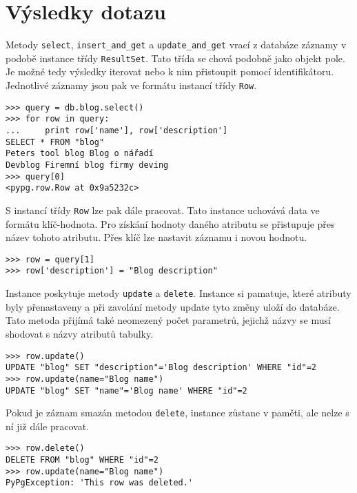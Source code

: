 \documentclass[11pt]{article}
\begin{document}
\section{Výsledky dotazu}

Metody \lstinline[style=inline]|select|, \lstinline[style=inline]|insert_and_get| a \lstinline[style=inline]|update_and_get| vrací z databáze záznamy v podobě instance třídy \lstinline[style=inline]|ResultSet|. Tato třída se chová podobně jako objekt pole. Je možné tedy výsledky iterovat nebo k nim přistoupit pomocí identifikátoru. Jednotlivé záznamy jsou pak ve formátu instancí třídy \lstinline[style=inline]|Row|.

\begin{lstlisting}[style=python]
>>> query = db.blog.select()
>>> for row in query:
...     print row['name'], row['description']
SELECT * FROM "blog"
Peters tool blog Blog o nářadí
Devblog Firemní blog firmy deving
>>> query[0]
<pypg.row.Row at 0x9a5232c>
\end{lstlisting}

S instancí třídy \lstinline[style=inline]|Row| lze pak dále pracovat. Tato instance uchovává data ve formátu klíč-hodnota. Pro získání hodnoty daného atributu se přistupuje přes název tohoto atributu. Přes klíč lze nastavit záznamu i novou hodnotu.
\begin{lstlisting}[style=python]
>>> row = query[1]
>>> row['description'] = "Blog description"
\end{lstlisting}

Instance poskytuje metody \lstinline[style=inline]|update| a \lstinline[style=inline]|delete|. Instance si pamatuje, které atributy byly přenastaveny a při zavolání metody update tyto změny uloží do databáze. Tato metoda přijímá také neomezený počet parametrů, jejichž názvy se musí shodovat s názvy atributů tabulky.
\begin{lstlisting}[style=python]
>>> row.update()
UPDATE "blog" SET "description"='Blog description' WHERE "id"=2
>>> row.update(name="Blog name")
UPDATE "blog" SET "name"='Blog name' WHERE "id"=2
\end{lstlisting}

Pokud je záznam smazán metodou \lstinline[style=inline]|delete|, instance zůstane v paměti, ale nelze s ní již dále pracovat.
\begin{lstlisting}[style=python]
>>> row.delete()
DELETE FROM "blog" WHERE "id"=2
>>> row.update(name="Blog name")
PyPgException: 'This row was deleted.'
\end{lstlisting}
\end{document}

